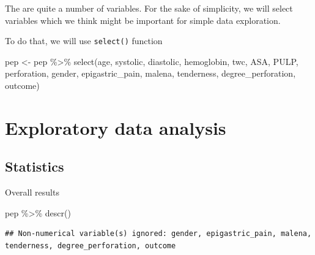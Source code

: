 \documentclass[
  10pt,
]{krantz}
\newenvironment{Shaded}{\begin{snugshade}}{\end{snugshade}}
\newcommand{\FunctionTok}[1]{\textcolor[rgb]{0.00,0.00,0.00}{#1}}
\newcommand{\NormalTok}[1]{#1}
\newcommand{\OtherTok}[1]{\textcolor[rgb]{0.56,0.35,0.01}{#1}}
\newcommand{\SpecialCharTok}[1]{\textcolor[rgb]{0.00,0.00,0.00}{#1}}
\begin{document}
The are quite a number of variables. For the sake of simplicity, we will select variables which we think might be important for simple data exploration.

To do that, we will use \texttt{select()} function

\begin{Shaded}
\begin{Highlighting}[]
\NormalTok{pep }\OtherTok{\textless{}{-}}\NormalTok{ pep }\SpecialCharTok{\%\textgreater{}\%} 
  \FunctionTok{select}\NormalTok{(age, systolic, diastolic, hemoglobin, twc, ASA, PULP, perforation,}
\NormalTok{         gender, epigastric\_pain, malena, tenderness, degree\_perforation, outcome)}
\end{Highlighting}
\end{Shaded}

\hypertarget{exploratory-data-analysis}{%
\section{Exploratory data analysis}\label{exploratory-data-analysis}}

\hypertarget{statistics}{%
\subsection{Statistics}\label{statistics}}

Overall results

\begin{Shaded}
\begin{Highlighting}[]
\NormalTok{pep }\SpecialCharTok{\%\textgreater{}\%} \FunctionTok{descr}\NormalTok{()}
\end{Highlighting}
\end{Shaded}

\begin{verbatim}
## Non-numerical variable(s) ignored: gender, epigastric_pain, malena, tenderness, degree_perforation, outcome
\end{verbatim}
\end{document}
